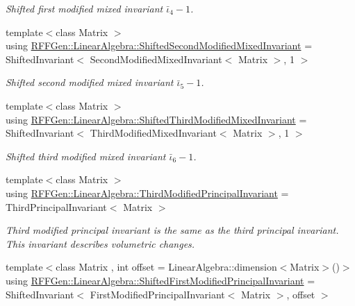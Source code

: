 \begin{DoxyCompactItemize}
\begin{DoxyCompactList}\small\item\em Shifted first modified mixed invariant $ \bar\iota_4 - 1 $. \end{DoxyCompactList}\item 
\hypertarget{group__LinearAlgebraGroup_ga9934f120b3c3db724c2216d2aca90cd1}{{\footnotesize template$<$class Matrix $>$ }\\using \hyperlink{group__LinearAlgebraGroup_ga9934f120b3c3db724c2216d2aca90cd1}{R\-F\-F\-Gen\-::\-Linear\-Algebra\-::\-Shifted\-Second\-Modified\-Mixed\-Invariant} = Shifted\-Invariant$<$ Second\-Modified\-Mixed\-Invariant$<$ Matrix $>$, 1 $>$}\label{group__LinearAlgebraGroup_ga9934f120b3c3db724c2216d2aca90cd1}

\begin{DoxyCompactList}\small\item\em Shifted second modified mixed invariant $ \bar\iota_5 - 1 $. \end{DoxyCompactList}\item 
\hypertarget{group__LinearAlgebraGroup_ga5b8725e66f697bd26179ea888e75a84e}{{\footnotesize template$<$class Matrix $>$ }\\using \hyperlink{group__LinearAlgebraGroup_ga5b8725e66f697bd26179ea888e75a84e}{R\-F\-F\-Gen\-::\-Linear\-Algebra\-::\-Shifted\-Third\-Modified\-Mixed\-Invariant} = Shifted\-Invariant$<$ Third\-Modified\-Mixed\-Invariant$<$ Matrix $>$, 1 $>$}\label{group__LinearAlgebraGroup_ga5b8725e66f697bd26179ea888e75a84e}

\begin{DoxyCompactList}\small\item\em Shifted third modified mixed invariant $ \bar\iota_6 - 1 $. \end{DoxyCompactList}\item 
\hypertarget{group__LinearAlgebraGroup_gaa792be731084cbbbc5156be9ea1b34ef}{{\footnotesize template$<$class Matrix $>$ }\\using \hyperlink{group__LinearAlgebraGroup_gaa792be731084cbbbc5156be9ea1b34ef}{R\-F\-F\-Gen\-::\-Linear\-Algebra\-::\-Third\-Modified\-Principal\-Invariant} = Third\-Principal\-Invariant$<$ Matrix $>$}\label{group__LinearAlgebraGroup_gaa792be731084cbbbc5156be9ea1b34ef}

\begin{DoxyCompactList}\small\item\em Third modified principal invariant is the same as the third principal invariant. This invariant describes volumetric changes. \end{DoxyCompactList}\item 
\hypertarget{group__LinearAlgebraGroup_gae337e31060263dfcdbcdd5301659a79c}{{\footnotesize template$<$class Matrix , int offset = Linear\-Algebra\-::dimension$<$\-Matrix$>$()$>$ }\\using \hyperlink{group__LinearAlgebraGroup_gae337e31060263dfcdbcdd5301659a79c}{R\-F\-F\-Gen\-::\-Linear\-Algebra\-::\-Shifted\-First\-Modified\-Principal\-Invariant} = Shifted\-Invariant$<$ First\-Modified\-Principal\-Invariant$<$ Matrix $>$, offset $>$}\label{group__LinearAlgebraGroup_gae337e31060263dfcdbcdd5301659a79c}


\end{DoxyCompactItemize}

